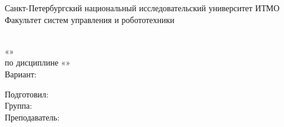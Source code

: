 \begin{titlepage}
\begin{center}
    Санкт-Петербургский национальный исследовательский университет ИТМО\\
        Факультет систем управления и робототехники
        \vskip 7cm
        
        \Huge \workType   \\
        \Large {«\workName »}  \\
        \Large {по дисциплине «\subjectName»} \\
        \Large {Вариант: \variantNum}
        \vskip 5cm
    \end{center}


    \begin{flushright}
        Подготовил:  \authorName      \\
        Группа: \groupNumber          \\
        Преподаватель:   \teacherName \\
    \end{flushright}
    \vskip 5cm


\begin{center}
    \placeNyear
\end{center}
\end{titlepage}